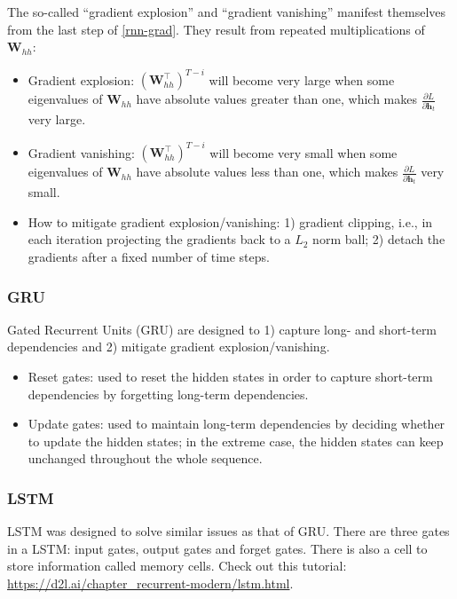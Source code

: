 The so-called ``gradient explosion'' and ``gradient vanishing'' manifest themselves from the last step of \eqref{rnn-grad}.
They result from repeated multiplications of $\bm{W}_{hh}$:
    \begin{itemize}
        \item Gradient explosion: $\left(\bm{W}_{hh}^\top \right)^{T-i}$ will become 
        very large when some eigenvalues of $\bm{W}_{hh}$ have absolute values greater than one, which makes $\frac{\partial L}{\partial \bm{h}_t}$ very large.
        \item Gradient vanishing: $\left(\bm{W}_{hh}^\top \right)^{T-i}$ will become very small when some eigenvalues of $\bm{W}_{hh}$ have absolute values less than one, which makes $\frac{\partial L}{\partial \bm{h}_t}$ very small.
        \item How to mitigate gradient explosion/vanishing: 1) gradient clipping, i.e., in each iteration projecting the gradients back to a $L_2$ norm ball; 2) detach the gradients after a fixed number of time steps.
    \end{itemize}
    
\subsubsection{GRU}
    Gated Recurrent Units (GRU) are designed to 1) capture long- and short-term dependencies and 2) mitigate gradient explosion/vanishing.
    \begin{itemize}
        \item Reset gates: used to reset the hidden states in order to capture short-term dependencies by forgetting long-term dependencies.
        \item Update gates: used to maintain long-term dependencies by deciding whether to update the hidden states; in the extreme case, the hidden states can keep unchanged throughout the whole sequence.
    \end{itemize}
    
\subsubsection{LSTM}
    LSTM was designed to solve similar issues as that of GRU.
    There are three gates in a LSTM: input gates, output gates and forget gates. 
    There is also a cell to store information called memory cells.
    Check out this tutorial: \url{https://d2l.ai/chapter_recurrent-modern/lstm.html}.
    
    
